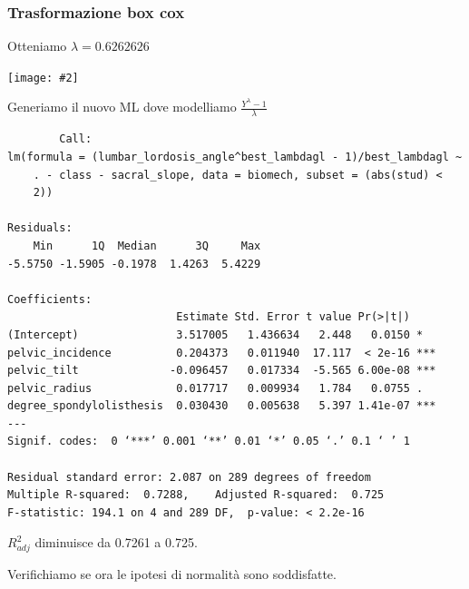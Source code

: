 \documentclass{beamer}
\newcommand{\fg}[2]{%
  \begin{center}
      \texttt{[image: \#2]}%
  \end{center}
}
\begin{document}
\begin{frame}
	\frametitle{Trasformazione box cox}
	Otteniamo $\lambda = 0.6262626$
	\fg{0.6}{09boxcox}
\end{frame}




\begin{frame}[fragile]
	Generiamo il nuovo ML dove modelliamo $\frac{Y^{\lambda}-1}{\lambda}$

	{\tiny
	\begin{verbatim}
		Call:
lm(formula = (lumbar_lordosis_angle^best_lambdagl - 1)/best_lambdagl ~ 
    . - class - sacral_slope, data = biomech, subset = (abs(stud) < 
    2))

Residuals:
    Min      1Q  Median      3Q     Max 
-5.5750 -1.5905 -0.1978  1.4263  5.4229 

Coefficients:
                          Estimate Std. Error t value Pr(>|t|)    
(Intercept)               3.517005   1.436634   2.448   0.0150 *  
pelvic_incidence          0.204373   0.011940  17.117  < 2e-16 ***
pelvic_tilt              -0.096457   0.017334  -5.565 6.00e-08 ***
pelvic_radius             0.017717   0.009934   1.784   0.0755 .  
degree_spondylolisthesis  0.030430   0.005638   5.397 1.41e-07 ***
---
Signif. codes:  0 ‘***’ 0.001 ‘**’ 0.01 ‘*’ 0.05 ‘.’ 0.1 ‘ ’ 1

Residual standard error: 2.087 on 289 degrees of freedom
Multiple R-squared:  0.7288,	Adjusted R-squared:  0.725 
F-statistic: 194.1 on 4 and 289 DF,  p-value: < 2.2e-16
	\end{verbatim}
	}

\end{frame}


\begin{frame}
	$R^2_{adj}$ diminuisce da 0.7261 a 0.725.

	Verifichiamo se ora le ipotesi di normalità sono soddisfatte.
\end{frame}
\end{document}
